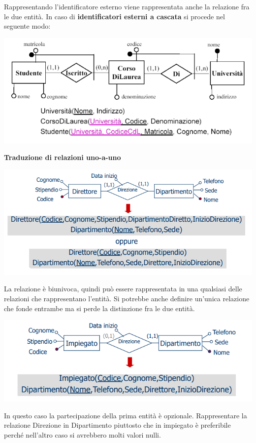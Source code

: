 \documentclass[12pt]{article}
\begin{document}
Rappresentando l'identificatore esterno viene rappresentata anche la relazione fra le due entità.
In caso di \textbf{identificatori esterni a cascata} si procede nel seguente modo:
\begin{center}
    \includegraphics[width = 1\textwidth]{Images/118.PNG}
\end{center}
\textbf{Traduzione di relazioni uno-a-uno}
\begin{center}
    \includegraphics[width = 1\textwidth]{Images/119.PNG}
\end{center}
La relazione è biunivoca, quindi può essere rappresentata in una qualsiasi delle relazioni che rappresentano l'entità.
Si potrebbe anche definire un'unica relazione che fonde entrambe ma si perde la distinzione fra le due entità.
\begin{center}
    \includegraphics[width = 1\textwidth]{Images/120.PNG}
\end{center}
In questo caso la partecipazione della prima entità è opzionale.
Rappresentare la relazione Direzione in Dipartimento piuttosto che in impiegato è preferibile perché nell'altro caso si avrebbero molti valori nulli.
\end{document}
